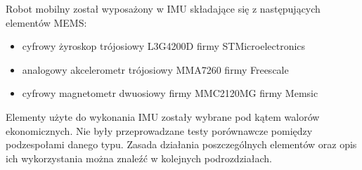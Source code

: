 Robot mobilny został wyposażony w IMU składające się z następujących elementów MEMS:
\begin{itemize}
  \item cyfrowy żyroskop trójosiowy L3G4200D firmy STMicroelectronics
  \item analogowy akcelerometr trójosiowy MMA7260 firmy Freescale
  \item cyfrowy magnetometr dwuosiowy firmy MMC2120MG firmy Memsic
\end{itemize}
Elementy użyte do wykonania IMU zostały wybrane pod kątem walorów ekonomicznych. 
Nie były przeprowadzane testy porównawcze pomiędzy podzespołami danego typu.
Zasada działania poszczególnych elementów oraz opis ich wykorzystania można znaleźć w kolejnych podrozdziałach.
